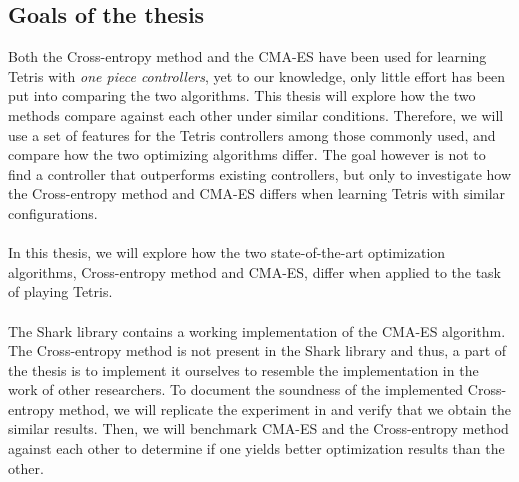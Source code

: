 \subsection{Goals of the thesis}

Both the Cross-entropy method and the CMA-ES have been used 
for learning Tetris with \textit{one piece controllers}, 
yet to our knowledge, only little effort has been put into 
comparing the two algorithms. This thesis will explore
how the two methods compare against each other under similar
conditions. Therefore, we will use a set of features for the 
Tetris controllers among those
commonly used, and compare how the two optimizing algorithms 
differ. The goal however is not to find a controller that 
outperforms existing controllers, but only to investigate 
how the Cross-entropy method and CMA-ES differs when learning Tetris
with similar configurations.\\
\\
In this thesis, we will explore how the two state-of-the-art
optimization algorithms, Cross-entropy method and CMA-ES, differ when 
applied to the task of playing Tetris.\\
\\
The Shark library \citep{shark08} contains a
working implementation of the CMA-ES 
algorithm. The Cross-entropy method 
is not present in the Shark library and thus, 
a part of the thesis is to implement it ourselves to resemble
the implementation in
the work of other researchers. To document the 
soundness of the implemented Cross-entropy method, 
we will replicate the experiment in \citep{thiery:09} and 
verify that we obtain the similar results.
Then, we will benchmark CMA-ES and the Cross-entropy method against each other 
to determine if one yields better optimization results than the other.
